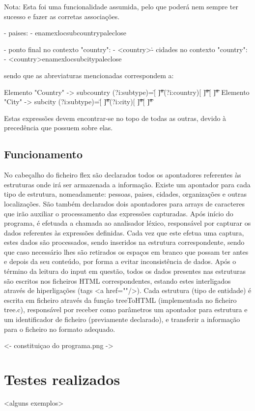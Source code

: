Nota: Esta foi uma funcionalidade assumida, pelo que poderá nem sempre ter sucesso e fazer as corretas associações.


- paises:
	- {enamex}{loc}{subcountry}{pal}{eclose} 

- ponto final no contexto "country":
	- <country>\. 

- cidades no contexto "country":
	- <country>{enamex}{loc}{subcity}{pal}{eclose}

sendo que as abreviaturas mencionadas correspondem a:

Elemento "Country" ->		subcountry  (?i:subtype)=\"[ \t]*(?i:country)[ \t]*\"[ \t]*\>
Elemento "City" -> 			subcity     (?i:subtype)=\"[ \t]*(?i:city)[ \t]*\"[ \t]*\>

Estas expressões devem encontrar-se no topo de todas as outras, devido à precedência que possuem sobre elas.


\subsection{Funcionamento}
\label{seq:enamex-func}

No cabeçalho do ficheiro flex são declarados todos os apontadores referentes às estruturas onde irá ser armazenada a informação. Existe um apontador para cada tipo de estrutura, nomeadamente: pessoas, paises, cidades, organizações e outras localizações. São também declarados dois apontadores para arrays de caracteres que irão auxiliar o processamento das expressões capturadas. Após início do programa, é efetuada a chamada ao analisador léxico, responsável por capturar os dados referentes às expressões definidas. Cada vez que este efetua uma captura, estes dados são processados, sendo inseridos na estrutura correspondente, sendo que caso necessário lhes são retirados os espaços em branco que possam ter antes e depois da seu conteúdo, por forma a evitar inconsistência de dados. Após o término da leitura do input em questão, todos os dados presentes nas estruturas são escritos nos ficheiros HTML correspondentes, estando estes interligados através de hiperligações (tags <a href=""/>). Cada estrutura (tipo de entidade) é escrita em ficheiro através da função treeToHTML (implementada no ficheiro tree.c), responsável por receber como parâmetros um apontador para estrutura e um identificador de ficheiro (previamente declarado), e transferir a informação para o ficheiro no formato adequado.


<- constituiçao do programa.png ->

\section{Testes realizados}
\label{seq:enamex-test}
<alguns exemplos>


